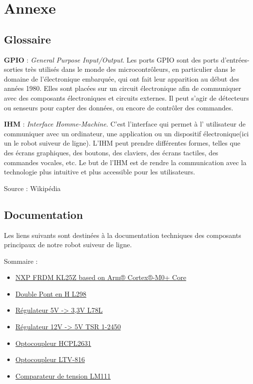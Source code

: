 \section{Annexe}

\subsection{Glossaire}

\noindent \textbf{GPIO} : \emph{General Purpose Input/Output}. Les ports GPIO sont des ports d'entrées-sorties très utilisés dans le monde des microcontrôleurs, en particulier dans le domaine de l'électronique embarquée, qui ont fait leur apparition au début des années 1980. Elles sont placées sur un circuit électronique afin de communiquer avec des composants électroniques et circuits externes. Il peut s'agir de détecteurs ou senseurs pour capter des données, ou encore de contrôler des commandes.

\noindent \textbf{IHM} : \emph{Interface Homme-Machine}. C'est l'interface qui permet à l' utilisateur de communiquer avec un ordinateur, une application ou un dispositif électronique(ici un le robot suiveur de ligne). L'IHM peut prendre différentes formes, telles que des écrans graphiques, des boutons, des claviers, des écrans tactiles, des commandes vocales, etc. Le but de l'IHM est de rendre la communication avec la technologie plus intuitive et plus accessible pour les utilisateurs.



\hfill Source : Wikipédia

\subsection{Documentation}

\noindent Les liens suivants sont destinées à la documentation techniques des composants principaux de notre robot suiveur de ligne.

Sommaire :
\begin{itemize}
    \item \href{https://www.nxp.com/docs/en/data-sheet/KL25P80M48SF0.pdf}{NXP FRDM KL25Z based on Arm® Cortex®-M0+ Core}
    \item \href{https://www.st.com/resource/en/datasheet/l298.pdf}{Double Pont en H L298}
    \item \href{https://www.st.com/resource/en/datasheet/l78l.pdf}{Régulateur 5V -> 3,3V L78L}
    \item \href{https://docs.rs-online.com/8525/0900766b816ed3dd.pdf}{Régulateur 12V -> 5V TSR 1-2450}
    \item \href{https://www.mouser.fr/datasheet/2/308/1/HCPL2631_D-1522483.pdf}{Optocoupleur HCPL2631}
    \item \href{https://www.mouser.fr/datasheet/2/239/LTV_8X6_series-2887056.pdf}{Optocoupleur LTV-816}
    \item \href{https://www.ti.com/lit/gpn/lm111-n}{Comparateur de tension LM111}
\end{itemize}

